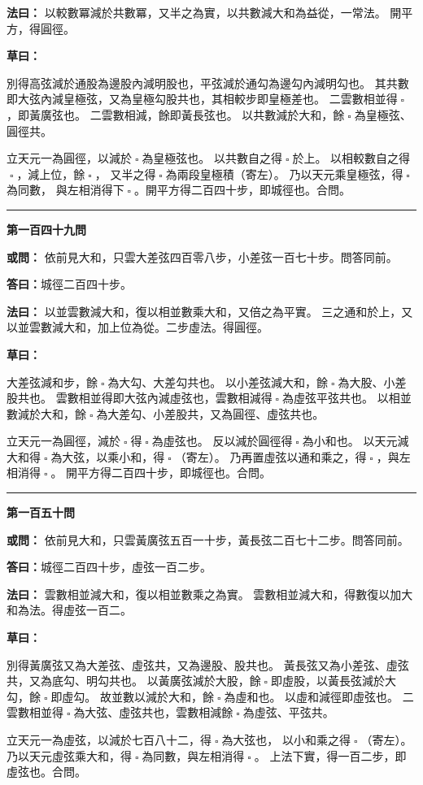 \documentclass[11pt,a4paper]{article}
\let\origsquare\square
\renewcommand{\square}{\ensuremath{\origsquare}}%
\newcommand{\longline}{\noindent\rule{\textwidth}{0.4pt}}
\newcommand{\owen}[1]{%
  \par\vspace{0.4em}%
  \noindent\textcolor{problemcolor}{\textbf{或問：}}{\tradfont #1}\par\nopagebreak%
}
\newcommand{\fayue}[1]{%
  \par\noindent\textcolor{methodcolor}{\textbf{法曰：}}{\tradfont #1}\par\nopagebreak%
}
\newcommand{\tsaoyue}[1]{%
  \par\noindent\textcolor{workcolor}{\textbf{草曰：}}{\tradfont #1}\par%
}
\newcommand{\dayue}[1]{%
  \par\noindent\textcolor{anscolor}{\textbf{答曰：}}{\tradfont #1}\par\nopagebreak%
}
\newcommand{\wen}[1]{\par\vspace{0.3em}\noindent\textcolor{problemcolor}{\textbf{第#1問}}\par}
\begin{document}
\fayue{%
以較數冪減於共數冪，又半之為實，以共數減大和為益從，一常法。
開平方，得圓徑。}

\tsaoyue{%
別得高弦減於通股為邊股內減明股也，平弦減於通勾為邊勾內減明勾也。
其共數即大弦內減皇極弦，又為皇極勾股共也，其相較步即皇極差也。
二雲數相並得$ \; \square \; $，即黃廣弦也。
二雲數相減，餘即黃長弦也。
以共數減於大和，餘$ \; \square \; $為皇極弦、圓徑共。

立天元一為圓徑，以減於$ \; \square \; $為皇極弦也。
以共數自之得$ \; \square \; $於上。
以相較數自之得$ \; \square \; $，減上位，餘$ \; \square \; $，
又半之得$ \; \square \; $為兩段皇極積（寄左）。
乃以天元乘皇極弦，得$ \; \square \; $為同數，
與左相消得下$ \; \square \; $。開平方得二百四十步，即城徑也。合問。}

\vspace{0.5cm}
\begin{center}
\longline
\end{center}

\wen{一百四十九}
\owen{%
依前見大和，只雲大差弦四百零八步，小差弦一百七十步。問答同前。}
\dayue{城徑二百四十步。}

\fayue{%
以並雲數減大和，復以相並數乘大和，又倍之為平實。
三之通和於上，又以並雲數減大和，加上位為從。二步虛法。得圓徑。}

\tsaoyue{%
大差弦減和步，餘$ \; \square \; $為大勾、大差勾共也。
以小差弦減大和，餘$ \; \square \; $為大股、小差股共也。
雲數相並得即大弦內減虛弦也，雲數相減得$ \; \square \; $為虛弦平弦共也。
以相並數減於大和，餘$ \; \square \; $為大差勾、小差股共，又為圓徑、虛弦共也。

立天元一為圓徑，減於$ \; \square \; $得$ \; \square \; $為虛弦也。
反以減於圓徑得$ \; \square \; $為小和也。
以天元減大和得$ \; \square \; $為大弦，以乘小和，得$ \; \square \; $（寄左）。
乃再置虛弦以通和乘之，得$ \; \square \; $，與左相消得$ \; \square \; $。
開平方得二百四十步，即城徑也。合問。}

\vspace{0.5cm}
\begin{center}
\longline
\end{center}

\wen{一百五十}
\owen{%
依前見大和，只雲黃廣弦五百一十步，黃長弦二百七十二步。問答同前。}
\dayue{城徑二百四十步，虛弦一百二步。}

\fayue{%
雲數相並減大和，復以相並數乘之為實。
雲數相並減大和，得數復以加大和為法。得虛弦一百二。}

\tsaoyue{%
別得黃廣弦又為大差弦、虛弦共，又為邊股、股共也。
黃長弦又為小差弦、虛弦共，又為底勾、明勾共也。
以黃廣弦減於大股，餘$ \; \square \; $即虛股，以黃長弦減於大勾，餘$ \; \square \; $即虛勾。
故並數以減於大和，餘$ \; \square \; $為虛和也。
以虛和減徑即虛弦也。
二雲數相並得$ \; \square \; $為大弦、虛弦共也，雲數相減餘$ \; \square \; $為虛弦、平弦共。

立天元一為虛弦，以減於七百八十二，得$ \; \square \; $為大弦也，
以小和乘之得$ \; \square \; $（寄左）。
乃以天元虛弦乘大和，得$ \; \square \; $為同數，與左相消得$ \; \square \; $。
上法下實，得一百二步，即虛弦也。合問。}
\end{document}
